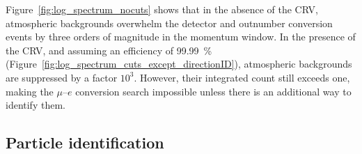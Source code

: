 Figure~\ref{fig:log_spectrum_nocuts} shows that in the absence of the CRV,
atmospheric backgrounds overwhelm the detector and outnumber conversion events
by three orders of magnitude in the momentum window. In the presence of the CRV,
and assuming an efficiency of \SI{99.99}{\percent}
(Figure~\ref{fig:log_spectrum_cuts_except_directionID}), atmospheric backgrounds
are suppressed by a factor $10^3$. However, their integrated count still exceeds
one, making the $\mu$--$e$ conversion search impossible unless there is an
additional way to identify them.








\subsection{Particle identification}


